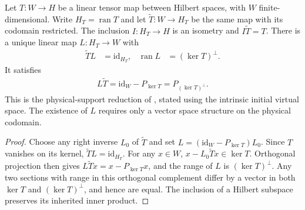 \begin{lemma}%
    \label{thm:peps_physical_support_section}
    \leanok
    Let $T:W\to H$ be a linear tensor map between Hilbert spaces, with
    $W$ finite-dimensional. Write $H_T=\operatorname{ran}T$ and let
    $\widetilde T:W\to H_T$ be the same map with its codomain restricted.
    The inclusion $I:H_T\to H$ is an isometry and
    $I\widetilde T=T$. There is a unique linear map $L:H_T\to W$ with
    \begin{align}
        \widetilde TL & =\mathrm{id}_{H_T},
                      & \operatorname{ran}L & =(\ker T)^\perp.
    \end{align}
    It satisfies
    \begin{align}
        L\widetilde T=\mathrm{id}_W-P_{\ker T}
        =P_{(\ker T)^\perp}.
    \end{align}
    This is the physical-support reduction of
    \cite[Observation~2.4]{Schuch2010PEPS}, stated using the intrinsic
    initial virtual space. The existence of $L$ requires only a vector
    space structure on the physical codomain.
\end{lemma}

\begin{proof}\leanok
    Choose any right inverse $L_0$ of $\widetilde T$ and set
    $L=(\mathrm{id}_W-P_{\ker T})L_0$. Since $T$ vanishes on its kernel,
    $\widetilde TL=\mathrm{id}_{H_T}$. For any $x\in W$,
    $x-L_0\widetilde Tx\in\ker T$. Orthogonal projection then gives
    $L\widetilde Tx=x-P_{\ker T}x$, and the range of $L$ is
    $(\ker T)^\perp$. Any two sections with range in this orthogonal
    complement differ by a vector in both $\ker T$ and $(\ker T)^\perp$,
    and hence are equal. The inclusion of a Hilbert subspace preserves
    its inherited inner product.
\end{proof}
